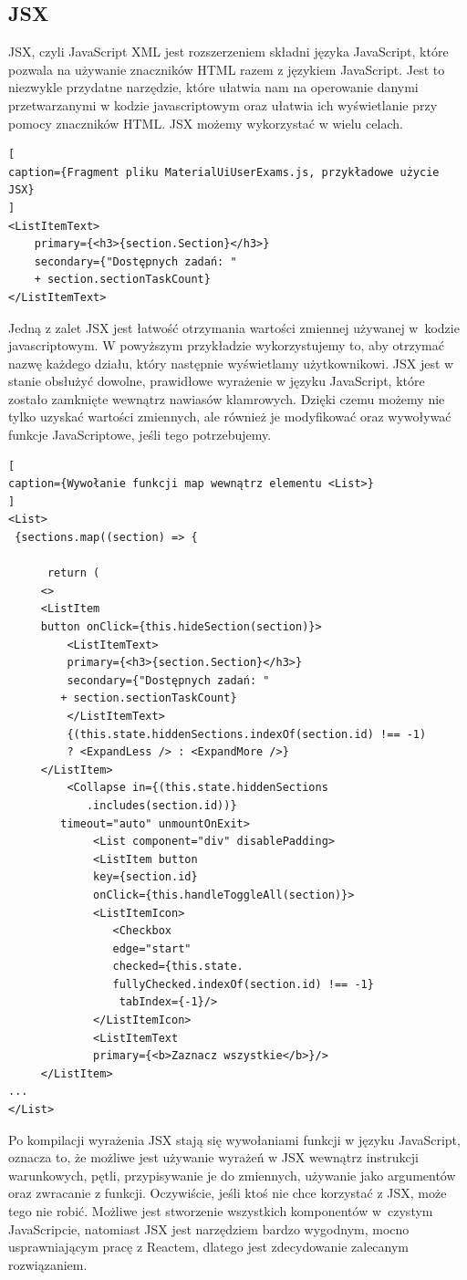 \documentclass[oneside,polski,logo,indent]{amuthesis}
\begin{document}
\subsection{JSX}
{
JSX, czyli JavaScript XML jest rozszerzeniem składni języka JavaScript, które pozwala na używanie znaczników HTML razem z językiem JavaScript. Jest to niezwykle przydatne narzędzie, które ułatwia nam na operowanie danymi przetwarzanymi w kodzie javascriptowym oraz ułatwia ich wyświetlanie przy pomocy znaczników HTML. JSX możemy wykorzystać w wielu celach.

\begin{lstlisting}[
caption={Fragment pliku MaterialUiUserExams.js, przykładowe użycie JSX}
]
<ListItemText>
	primary={<h3>{section.Section}</h3>}
	secondary={"Dostępnych zadań: " 
	+ section.sectionTaskCount}
</ListItemText>
\end{lstlisting}
Jedną z zalet JSX jest łatwość otrzymania wartości zmiennej używanej w~kodzie javascriptowym. W powyższym przykładzie wykorzystujemy to, aby otrzymać nazwę każdego działu, który następnie wyświetlamy użytkownikowi.
JSX jest w stanie obsłużyć dowolne, prawidłowe wyrażenie w języku JavaScript, które zostało zamknięte wewnątrz nawiasów klamrowych. Dzięki czemu możemy nie tylko uzyskać wartości zmiennych, ale również je modyfikować oraz wywoływać funkcje JavaScriptowe, jeśli tego potrzebujemy.

\begin{lstlisting}[
caption={Wywołanie funkcji map wewnątrz elementu <List>}
]
<List>
 {sections.map((section) => {
                     
	  return (
	 <>
	 <ListItem
	 button onClick={this.hideSection(section)}>
		 <ListItemText>
		 primary={<h3>{section.Section}</h3>}
		 secondary={"Dostępnych zadań: " 
		+ section.sectionTaskCount}
		 </ListItemText>
		 {(this.state.hiddenSections.indexOf(section.id) !== -1)
		 ? <ExpandLess /> : <ExpandMore />}
	 </ListItem>
		 <Collapse in={(this.state.hiddenSections
			.includes(section.id))} 
		timeout="auto" unmountOnExit>
			 <List component="div" disablePadding>
			 <ListItem button
			 key={section.id}
			 onClick={this.handleToggleAll(section)}>
			 <ListItemIcon>
			 	<Checkbox
			 	edge="start"
			 	checked={this.state.
				fullyChecked.indexOf(section.id) !== -1}
				 tabIndex={-1}/>
			 </ListItemIcon>
			 <ListItemText 
			 primary={<b>Zaznacz wszystkie</b>}/>
	 </ListItem>
...
</List>
\end{lstlisting}
Po kompilacji wyrażenia JSX stają się wywołaniami funkcji w języku JavaScript, oznacza to, że możliwe jest używanie wyrażeń w JSX wewnątrz instrukcji warunkowych, pętli, przypisywanie je do zmiennych, używanie jako argumentów oraz zwracanie z funkcji.
Oczywiście, jeśli ktoś nie chce korzystać z JSX, może tego nie robić. Możliwe jest stworzenie wszystkich komponentów w~czystym JavaScripcie, natomiast JSX jest narzędziem bardzo wygodnym, mocno usprawniającym pracę z Reactem, dlatego jest zdecydowanie zalecanym rozwiązaniem.
}
\end{document}
